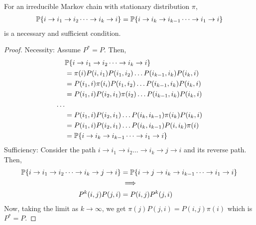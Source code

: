 \documentclass[all-lectures.tex]{subfiles}
\begin{document}
\begin{prop}
For an irreducible Markov chain with stationary distribution $\pi$, 
\begin{align*}
\P\{i\rightarrow i_1 \rightarrow i_2 \dots \rightarrow i_k \rightarrow i\} = \P\{i \rightarrow i_k \rightarrow i_{k-1} \dots \rightarrow i_1 \rightarrow i\}
\end{align*}
is a necessary and sufficient condition. 
\begin{proof}
Necessity: Assume $P^* = P$. Then, 
\begin{align*}
&\P\{i\rightarrow i_1 \rightarrow i_2 \dots \rightarrow i_k \rightarrow i\} \\
&= \pi(i)P(i,i_1)P(i_1,i_2)\dots P(i_{k-1},i_{k})P(i_k,i)\\
& = P(i_1,i)\pi(i_i) P(i_1,i_2)\dots P(i_{k-1},i_{k})P(i_k,i) \\
& = P(i_1,i)P(i_2,i_1)\pi(i_2) \dots P(i_{k-1},i_{k})P(i_k,i) \\
\dots \\
& = P(i_1,i)P(i_2,i_1) \dots P(i_{k},i_{k-1})\pi(i_k)P(i_k,i) \\
& = P(i_1,i)P(i_2,i_1) \dots P(i_{k},i_{k-1})P(i,i_k)\pi(i) \\
&= \P\{i \rightarrow i_k \rightarrow i_{k-1} \dots \rightarrow i_1 \rightarrow i\}
\end{align*}
Sufficiency: Consider the path $i\rightarrow i_1 \rightarrow i_2 \dots \rightarrow i_k \rightarrow j\rightarrow i$ and its reverse path. Then, 
\begin{align*}
\P\{i\rightarrow i_1 \rightarrow i_2 \dots \rightarrow i_k \rightarrow j \rightarrow i\} &= \P\{i \rightarrow j \rightarrow i_k \rightarrow i_{k-1} \dots \rightarrow i_1 \rightarrow i\} \\
 &\implies  \\
P^{k}(i,j)P(j,i) &= P(i,j)P^{k}(j,i)
\end{align*}
Now, taking the limit as $k\rightarrow \infty$, we get $\pi(j)P(j,i) = P(i,j)\pi(i)$ which is $P^* = P$.
\end{proof}
\end{prop}
\end{document}

